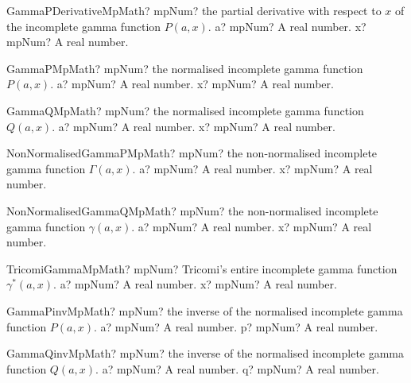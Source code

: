 \documentclass[12pt,a4paper,openany]{book}
\begin{document}
\begin{mpFunctionsExtract}
\mpFunctionTwoNotImplemented
{GammaPDerivativeMpMath? mpNum? the partial derivative with respect to $x$ of the incomplete gamma function $P(a,x)$.}
{a? mpNum? A real number.}
{x? mpNum? A real number.}
\end{mpFunctionsExtract}

\begin{mpFunctionsExtract}
\mpFunctionTwoNotImplemented
{GammaPMpMath? mpNum? the normalised incomplete gamma function $P(a,x)$.}
{a? mpNum? A real number.}
{x? mpNum? A real number.}
\end{mpFunctionsExtract}

\begin{mpFunctionsExtract}
\mpFunctionTwoNotImplemented
{GammaQMpMath? mpNum? the normalised incomplete gamma function $Q(a,x)$.}
{a? mpNum? A real number.}
{x? mpNum? A real number.}
\end{mpFunctionsExtract}

\begin{mpFunctionsExtract}
\mpFunctionTwoNotImplemented
{NonNormalisedGammaPMpMath? mpNum? the non-normalised incomplete gamma function $\Gamma(a,x)$.}
{a? mpNum? A real number.}
{x? mpNum? A real number.}
\end{mpFunctionsExtract}

\begin{mpFunctionsExtract}
\mpFunctionTwoNotImplemented
{NonNormalisedGammaQMpMath? mpNum? the non-normalised incomplete gamma function $\gamma(a,x)$.}
{a? mpNum? A real number.}
{x? mpNum? A real number.}
\end{mpFunctionsExtract}

\begin{mpFunctionsExtract}
\mpFunctionTwoNotImplemented
{TricomiGammaMpMath? mpNum? Tricomi's entire incomplete gamma function $\gamma^*(a,x)$.}
{a? mpNum? A real number.}
{x? mpNum? A real number.}
\end{mpFunctionsExtract}

\begin{mpFunctionsExtract}
\mpFunctionTwoNotImplemented
{GammaPinvMpMath? mpNum? the inverse of the normalised incomplete gamma function $P(a,x)$.}
{a? mpNum? A real number.}
{p? mpNum? A real number.}
\end{mpFunctionsExtract}

\begin{mpFunctionsExtract}
\mpFunctionTwoNotImplemented
{GammaQinvMpMath? mpNum? the inverse of the normalised incomplete gamma function $Q(a,x)$.}
{a? mpNum? A real number.}
{q? mpNum? A real number.}
\end{mpFunctionsExtract}
\end{document}
